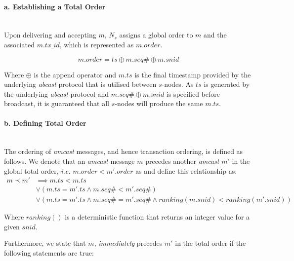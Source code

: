 \begin{enumerate}
        \paragraph{a. Establishing a Total Order} \hfill \\
		Upon delivering and accepting $m$, $N_s$ assigns a global order to $m$ and the associated $m.tx\_id$, which is represented as $m.order$.  
        
        \begin{equation*}
            m.order = ts\oplus m.seq\# \oplus m.snid
        \end{equation*}        		
		
        Where $\oplus$ is the append operator and $m.ts$ is the final timestamp provided by the underlying \emph{abcast} protocol that is utilised between $s$-nodes.  As $ts$ is generated by the underlying \emph{abcast} protocol and $m.seq\# \oplus m.snid$ is specified before broadcast, it is guaranteed that all $s$-nodes will produce the same $m.ts$.  
        
        \paragraph{b. Defining Total Order} \hfill \\
        The ordering of \emph{amcast} messages, and hence transaction ordering, is defined as follows.  We denote that an \emph{amcast} message $m$ precedes another \emph{amcast} $m'$ in the global total order, \emph{i.e. $m.order < m'.order$} as   and define this relationship as:
        \begin{equation*}
            \begin{split}
                   m \prec m' &\implies  m.ts < m.ts \\
                   & \lor \left(m.ts = m'.ts  \land m.seq\# < m'.seq\#\right) \\
                   & \lor \left(m.ts = m'.ts  \land m.seq\# = m'.seq\# \land ranking(m.snid) < ranking(m'.snid) \right)
            \end{split}
        \end{equation*}
        
        Where $ranking()$ is a deterministic function that returns an integer value for a given $snid$.  
                
        Furthermore, we state that $m$, \emph{immediately} precedes $m'$ in the total order if the following statements are true:
        

\end{enumerate}
